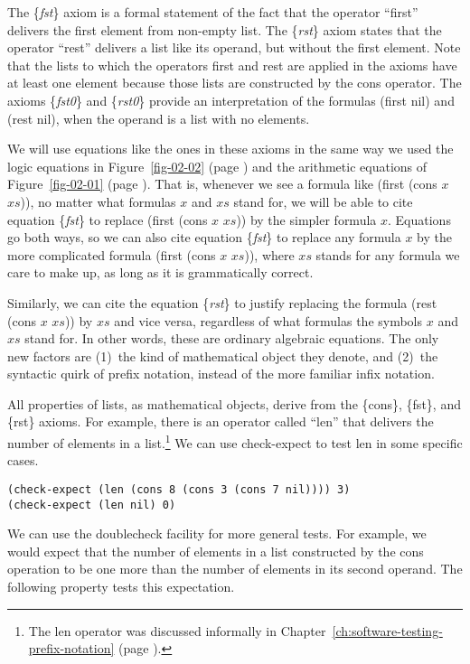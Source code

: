 The \{\emph{fst}\} axiom is a formal statement of the fact that
the operator ``first'' delivers the first element from non-empty list.
The \{\emph{rst}\} axiom states that the operator ``rest'' delivers
a list like its operand, but without the first element.
Note that the lists to which the operators first and rest
are applied in the axioms have at least one element
because those lists are constructed by the cons operator.
The axioms
\{\emph{fst0}\} and \{\emph{rst0}\}
provide an interpretation of the formulas (first nil) and (rest nil),
when the operand is a list with no elements.

We will use equations like the ones in these axioms in the
same way we used the logic equations in Figure~\ref{fig-02-02}
(page \pageref{fig-02-02}) and the arithmetic equations of
Figure~\ref{fig-02-01} (page \pageref{fig-02-01}).
That is, whenever we see a formula like (first (cons $x$ $xs$)),
no matter what formulas $x$ and $xs$ stand for,
we will be able to cite equation \{\emph{fst}\} to replace
(first (cons $x$ $xs$)) by the simpler formula $x$.
Equations go both ways, so we can also cite equation \{\emph{fst}\}
to replace any formula $x$ by the more complicated formula
(first (cons $x$ $xs$)), where $xs$ stands for any formula
we care to make up, as long as it is grammatically correct.

Similarly, we can cite the equation \{\emph{rst}\} to justify
replacing the formula (rest (cons $x$ $xs$)) by $xs$
and vice versa, regardless of what formulas the symbols $x$ and $xs$ stand for.
In other words, these are ordinary algebraic equations.
The only new factors are
(1)~the kind of mathematical object they denote, and
(2)~the syntactic quirk of prefix notation, instead of the more familiar infix notation.

All properties of lists,
as mathematical objects,
derive from the \{cons\}, \{fst\}, and \{rst\} axioms.
For example, there is an operator called ``len''
that delivers the number of elements in a list.\footnote{The
len operator was discussed informally in Chapter~\ref{ch:software-testing-prefix-notation}
(page \pageref{len-op-informal}).}
We can use check-expect to test len in some specific cases.

\begin{Verbatim}
(check-expect (len (cons 8 (cons 3 (cons 7 nil)))) 3)
(check-expect (len nil) 0)
\end{Verbatim}

We can use the doublecheck facility for more general tests.
For example, we would expect that the number of elements
in a list constructed by the cons operation to be
one more than the number of elements in its second operand.
The following property tests this expectation.


